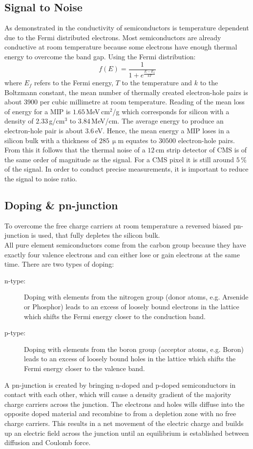 \subsection{Signal to Noise}
As demonstrated in  the conductivity of semiconductors is temperature dependent due to the Fermi distributed electrons. Most semiconductors are already conductive at room temperature because some electrons have enough thermal energy to overcome the band gap. Using the Fermi distribution:
\begin{equation}
	f(E) = \frac{1}{1+e^{\frac{E-E_{f}}{kT} }}
\end{equation}
where $E_{f}$ refers to the Fermi energy, $T$ to the temperature and $k$ to the Boltzmann constant, the mean number of thermally created electron-hole pairs is about $3900$ per cubic millimetre at room temperature. Reading of  the mean loss of energy for a \ac{MIP} is $1.65\,$MeV\,cm$^{2}$/g which corresponds for silicon with a density of $2.33\,$g/cm$^{3}$ to $3.84\,$MeV/cm. The average energy to produce an electron-hole pair is about $3.6\,$eV. Hence, the mean energy a \ac{MIP} loses in a silicon bulk with a thickness of $285\,\upmu$m equates to $30500$ electron-hole pairs. From this it follows that the thermal noise of a $12\,$cm strip detector of \ac{CMS} is of the same order of magnitude as the signal. For a \ac{CMS} pixel it is still around $5\,$\% of the signal. In order to conduct precise measurements, it is important to reduce the signal to noise ratio.
\subsection{Doping \& pn-junction}
To overcome the free charge carriers at room temperature a reversed biased pn-junction is used, that fully depletes the silicon bulk.\\
All pure element semiconductors come from the carbon group because they have exactly four valence electrons and can either lose or gain electrons at the same time. There are two types of doping:
\begin{description}
	\item[n-type:]{Doping with elements from the nitrogen group (donor atoms, e.g. Arsenide or Phosphor) leads to an excess of loosely bound electrons in the lattice which shifts the Fermi energy closer to the conduction band.}
	\item[p-type:] Doping with elements from the boron group (acceptor atoms, e.g. Boron) leads to an excess of loosely bound holes in the lattice which shifts the Fermi energy closer to the valence band.
\end{description}
A pn-junction is created by bringing n-doped and p-doped semiconductors in contact with each other, which will cause a density gradient of the majority charge carriers across the junction. The electrons and holes wills diffuse into the opposite doped material and recombine to from a depletion zone with no free charge carriers. This results in a net movement of the electric charge and builds up an electric field across the junction until an equilibrium is established between diffusion and Coulomb force. 
